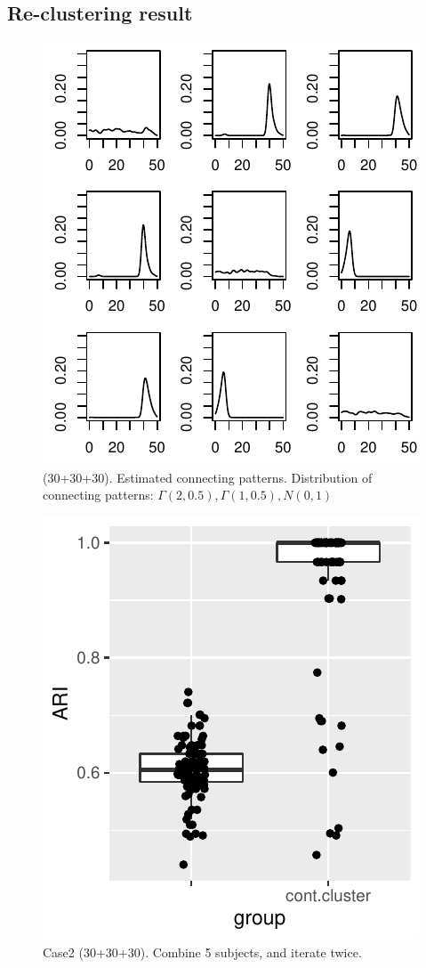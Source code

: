 

\subsection*{Re-clustering result}


\begin{figure}[H]
\includegraphics[width=.6\textwidth]{../simulation/plots/case2_conn_patt}
\caption{(30+30+30). Estimated connecting patterns. Distribution of connecting patterns: $\Gamma(2,0.5),\Gamma(1,0.5),N(0,1)$}
\end{figure}


\begin{figure}[H]
\includegraphics[width=.5\textwidth]{../simulation/plots/case2_cont_cluster}
\caption{Case2 (30+30+30). Combine 5 subjects, and iterate twice.}
\end{figure}



